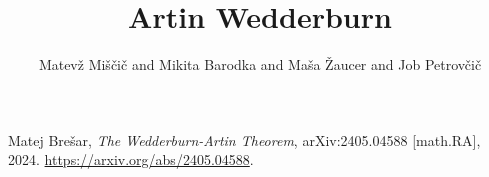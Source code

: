 \documentclass{article}
\title{Artin Wedderburn}
\author{Matevž Miščič and Mikita Barodka and Maša Žaucer and Job Petrovčič}
\begin{document}
\maketitle


\begin{thebibliography}{99}

    Matej Brešar, 
    \textit{The Wedderburn-Artin Theorem}, 
    arXiv:2405.04588 [math.RA], 2024. 
    \url{https://arxiv.org/abs/2405.04588}.
    
    \end{thebibliography}
\end{document}
